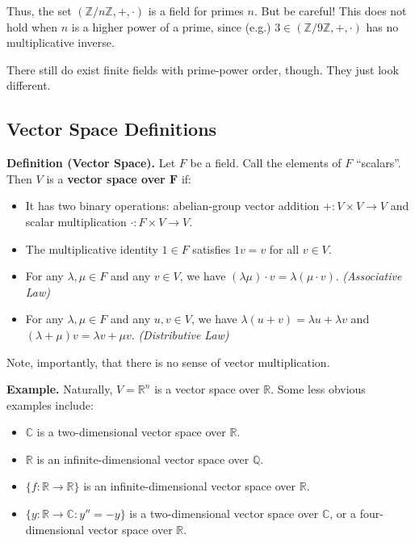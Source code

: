 Thus, the set $(\mathbb{Z}/n\mathbb{Z}, +, \cdot)$ is a field for primes $n$.  But be careful!  This does not hold when $n$ is a higher power of a prime, since (e.g.) $3 \in (\mathbb{Z}/9\mathbb{Z}, +, \cdot)$ has no multiplicative inverse.

\begin{remark}
    There still do exist finite fields with prime-power order, though.  They just look different.
\end{remark}

\subsection{Vector Space Definitions}

\textbf{Definition (Vector Space).} Let $F$ be a field.  Call the elements of $F$ ``scalars''.  Then $V$ is a \textbf{vector space over $\mathbf{F}$} if:
\begin{itemize}
    \item It has two binary operations: abelian-group vector addition $+: V \times V \to V$ and scalar multiplication $\cdot: F \times V \to V$.
    \item The multiplicative identity $1 \in F$ satisfies $1v = v$ for all $v \in V$.
    \item For any $\lambda, \mu \in F$ and any $v \in V$, we have $(\lambda \mu) \cdot v = \lambda(\mu \cdot v)$. \emph{(Associative Law)}
    \item For any $\lambda, \mu \in F$ and any $u, v \in V$, we have $\lambda(u + v) = \lambda u + \lambda v$ and $(\lambda + \mu)v = \lambda v + \mu v$. \emph{(Distributive Law)}
\end{itemize}
Note, importantly, that there is no sense of vector multiplication.

\textbf{Example.} Naturally, $V = \mathbb{R}^n$ is a vector space over $\mathbb{R}$.  Some less obvious examples include:
\begin{itemize}
    \item $\mathbb{C}$ is a two-dimensional vector space over $\mathbb{R}$.
    \item $\mathbb{R}$ is an infinite-dimensional vector space over $\mathbb{Q}$.
    \item $\{f: \mathbb{R} \to \mathbb{R}\}$ is an infinite-dimensional vector space over $\mathbb{R}$.
    \item $\{y: \mathbb{R} \to \mathbb{C}: y'' = -y\}$ is a two-dimensional vector space over $\mathbb{C}$, or a four-dimensional vector space over $\mathbb{R}$.
\end{itemize}

